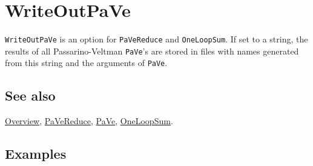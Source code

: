 \documentclass[../FeynCalcManual.tex]{subfiles}
\begin{document}
\hypertarget{writeoutpave}{%
\section{WriteOutPaVe}\label{writeoutpave}}

\texttt{WriteOutPaVe} is an option for \texttt{PaVeReduce} and
\texttt{OneLoopSum}. If set to a string, the results of all
Passarino-Veltman \texttt{PaVe}'s are stored in files with names
generated from this string and the arguments of \texttt{PaVe}.

\subsection{See also}

\hyperlink{toc}{Overview}, \hyperlink{pavereduce}{PaVeReduce},
\hyperlink{pave}{PaVe}, \hyperlink{oneloopsum}{OneLoopSum}.

\subsection{Examples}
\end{document}
